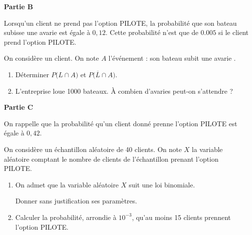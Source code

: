 \smallskip

\textbf{Partie B}

\medskip

Lorsqu'un client ne prend pas l'option PILOTE, la probabilité que son bateau subisse une avarie est égale à $0,12$. Cette probabilité n'est que de $\num{0,005}$ si le client prend l'option PILOTE.

On considère un client. On note $A$ l'événement : \og son bateau subit une avarie \fg.

\begin{enumerate}
	\item Déterminer $P\big(L \cap A\big)$ et $P\big(\overline{L} \cap A\big)$.
	\item L'entreprise loue \num{1000} bateaux. À combien d'avaries peut-on s'attendre ?
\end{enumerate}

\smallskip

\textbf{Partie C}

\medskip

On rappelle que la probabilité qu'un client donné prenne l'option PILOTE est égale à $0,42$.

On considère un échantillon aléatoire de 40 clients. On note $X$ la variable aléatoire comptant le nombre de clients de l'échantillon prenant l'option PILOTE.

\begin{enumerate}
	\item On admet que la variable aléatoire $X$ suit une loi binomiale.
	
	Donner sans justification ses paramètres.
	\item Calculer la probabilité, arrondie à $10^{-3}$, qu'au moins 15 clients prennent l'option PILOTE.
\end{enumerate}
